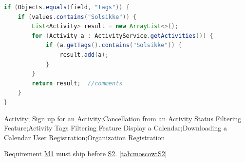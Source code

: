 
\begin{lstlisting}[language=Java]
if (Objects.equals(field, "tags")) {
    if (values.contains("Solsikke")) {
        List<Activity> result = new ArrayList<>();
        for (Activity a : ActivityService.getActivities()) {
            if (a.getTags().contains("Solsikke")) {
                result.add(a);
            }
        }
        return result;  //comments
    }
}
\end{lstlisting}


\moscow
    {Activity; Sign up for an Activity;Cancellation from an Activity}
    {Status Filtering Feature;Activity Tags Filtering Feature}
    {Display a Calendar;Downloading a Calendar}
    {User Registration;Organization Registration}

Requirement \hyperref[tab:moscow:M1]{M1} must ship before \hyperref[tab:moscow:S2]{S2}.
\ref{tab:moscow:S2}


\newpage

